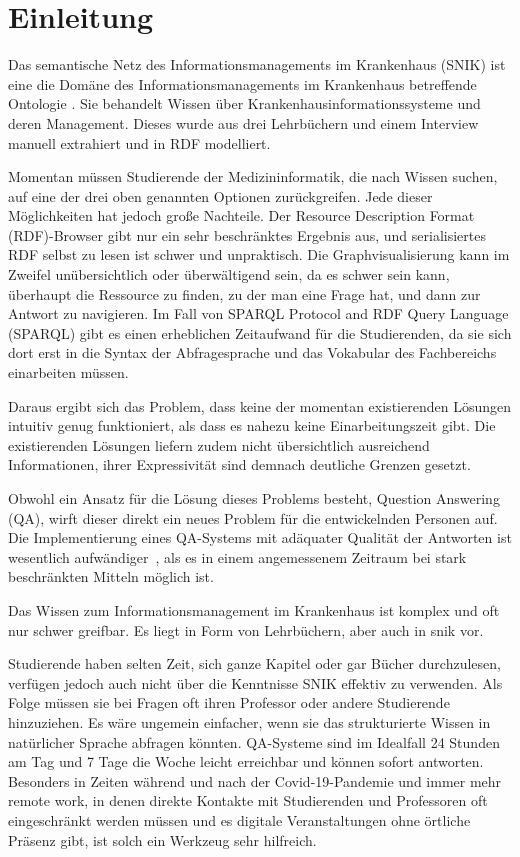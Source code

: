 \documentclass[utf8,biblatex]{lni}
\begin{document}
%

\section{Einleitung}

Das semantische Netz des Informationsmanagements im Krankenhaus (SNIK) ist eine
die Domäne des Informationsmanagements im Krankenhaus betreffende Ontologie \cite{domaene}.
Sie behandelt Wissen über Krankenhausinformationssysteme und deren Management.
Dieses wurde aus drei Lehrbüchern \cite{bb,ob,he} und einem Interview \cite{ciosurvey} manuell extrahiert und in RDF modelliert.

Momentan müssen Studierende der Medizininformatik, die nach Wissen suchen, auf eine der drei oben genannten Optionen zurückgreifen.
Jede dieser Möglichkeiten hat jedoch große Nachteile.
Der Resource Description Format (RDF)-Browser gibt nur ein sehr beschränktes Ergebnis aus, und serialisiertes RDF selbst zu lesen ist schwer und unpraktisch.
Die Graphvisualisierung kann im Zweifel unübersichtlich oder überwältigend sein, da es schwer sein kann, überhaupt die Ressource zu finden, zu der man eine Frage hat, und dann zur Antwort zu navigieren.
Im Fall von SPARQL Protocol and RDF Query Language (SPARQL) gibt es einen erheblichen Zeitaufwand für die Studierenden, da sie sich dort erst in die Syntax der Abfragesprache und das Vokabular des Fachbereichs einarbeiten müssen.

Daraus ergibt sich das Problem, dass keine der momentan existierenden Lösungen intuitiv genug funktioniert, als dass es nahezu keine Einarbeitungszeit gibt.
Die existierenden Lösungen liefern zudem nicht übersichtlich ausreichend Informationen, ihrer Expressivität sind demnach deutliche Grenzen gesetzt.

Obwohl ein Ansatz für die Lösung dieses Problems besteht, Question Answering (QA), wirft dieser direkt ein neues Problem für die entwickelnden Personen auf.
Die Implementierung eines QA-Systems mit adäquater Qualität der Antworten ist wesentlich aufwändiger~\citep[S.~3]{qanswer}, als es in einem angemessenem Zeitraum bei stark beschränkten Mitteln möglich ist.

Das Wissen zum Informationsmanagement im Krankenhaus ist komplex und oft nur schwer greifbar.
Es liegt in Form von Lehrbüchern, aber auch in \acs{snik} vor.

Studierende haben selten Zeit, sich ganze Kapitel oder gar Bücher durchzulesen, verfügen jedoch auch nicht über die Kenntnisse SNIK effektiv zu verwenden.
Als Folge müssen sie bei Fragen oft ihren Professor oder andere Studierende hinzuziehen.
Es wäre ungemein einfacher, wenn sie das strukturierte Wissen in natürlicher Sprache abfragen könnten.
QA-Systeme sind im Idealfall 24 Stunden am Tag und 7 Tage die Woche leicht erreichbar und können sofort antworten. 
Besonders in Zeiten während und nach der Covid-19-Pandemie und immer mehr remote work, in denen direkte Kontakte mit Studierenden und Professoren oft eingeschränkt werden müssen und es digitale Veranstaltungen ohne örtliche Präsenz gibt, ist solch ein Werkzeug sehr hilfreich.
\end{document}
